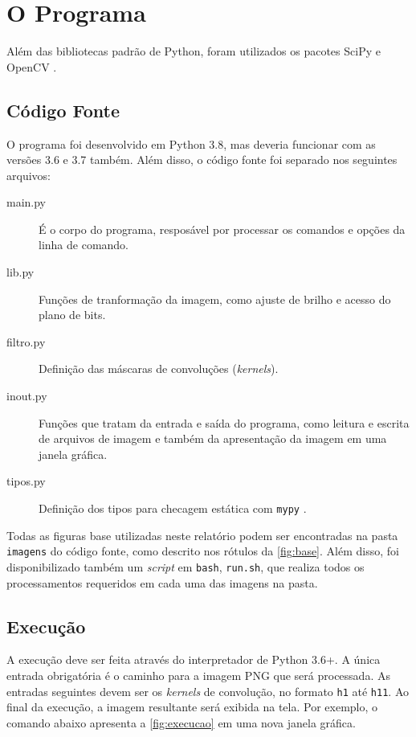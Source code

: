 \section{O Programa}

Além das bibliotecas padrão de Python, foram utilizados os pacotes SciPy \autocite{ref:scipy} e OpenCV \autocite{ref:opencv}.

\subsection{Código Fonte}

    O programa foi desenvolvido em Python 3.8, mas deveria funcionar com as versões 3.6 e 3.7 também. Além disso, o código fonte foi separado nos seguintes arquivos:

    \begin{description}
        \item[main.py] É o corpo do programa, resposável por processar os comandos e opções da linha de comando.

        \item[lib.py] Funções de tranformação da imagem, como ajuste de brilho e acesso do plano de bits.

        \item[filtro.py] Definição das máscaras de convoluções (\textit{kernels}).

        \item[inout.py] Funções que tratam da entrada e saída do programa, como leitura e escrita de arquivos de imagem e também da apresentação da imagem em uma janela gráfica.

        \item[tipos.py] Definição dos tipos para checagem estática com \texttt{mypy} \autocite{ref:mypy}.
    \end{description}

    Todas as figuras base utilizadas neste relatório podem ser encontradas na pasta \texttt{imagens} do código fonte, como descrito nos rótulos da \cref{fig:base}. Além disso, foi disponibilizado também um \textit{script} em \texttt{bash}, \texttt{run.sh}, que realiza todos os processamentos requeridos em cada uma das imagens na pasta.

\subsection{Execução} \label{sec:execucao}

    A execução deve ser feita através do interpretador de Python 3.6+. A única entrada obrigatória é o caminho para a imagem PNG que será processada. As entradas seguintes devem ser os \textit{kernels} de convolução, no formato \texttt{h1} até \texttt{h11}. Ao final da execução, a imagem resultante será exibida na tela. Por exemplo, o comando abaixo apresenta a \cref{fig:execucao} em uma nova janela gráfica.

